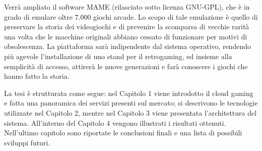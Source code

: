 Verrà ampliato il software MAME (rilasciato sotto licenza GNU-GPL), che è in grado di emulare  oltre 7.000 giochi arcade. Lo scopo di tale emulazione è quello di preservare la storia dei videogiochi e di prevenire la scomparsa di vecchie rarità una volta che le macchine originali abbiano cessato di funzionare per motivi di obsolescenza. La piattaforma sarà indipendente dal sistema operativo, rendendo più agevole l’installazione di uno stand per il retrogaming, ed insieme alla semplicità di accesso, attirerà le nuove generazioni e farà conoscere i giochi che hanno fatto la storia.

La tesi è strutturata come segue: nel Capitolo 1 viene introdotto il cloud gaming e fatta una panoramica dei servizi presenti sul mercato; si descrivono le tecnologie utilizzate nel Capitolo 2, mentre nel Capitolo 3 viene presentata l'architettura del sistema. All’interno del Capitolo 4 vengono illustrati i risultati ottenuti. Nell'ultimo capitolo sono riportate le conclusioni finali e una lista di possibili sviluppi futuri.